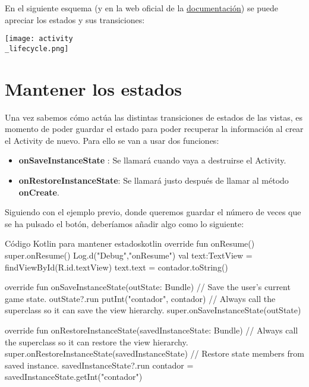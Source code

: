 En el siguiente esquema (y en la web oficial de la \href{https://developer.android.com/guide/components/activities/activity-lifecycle#alc}{documentación}) se puede apreciar los estados y sus transiciones:

\begin{center}
    \texttt{[image: activity\\\_lifecycle.png]}
\end{center}



\section{Mantener los estados}

Una vez sabemos cómo actúa las distintas transiciones de estados de las vistas, es momento de poder guardar el estado para poder recuperar la información al crear el Activity de nuevo. Para ello se van a usar dos funciones:

\begin{itemize}
    \item \textbf{onSaveInstanceState} : Se llamará cuando vaya a destruirse el Activity.
    \item \textbf{onRestoreInstanceState}: Se llamará justo después de llamar al método \textbf{onCreate}.
\end{itemize}

Siguiendo con el ejemplo previo, donde queremos guardar el número de veces que se ha pulsado el botón, deberíamos añadir algo como lo siguiente:

\begin{mycode}{Código Kotlin para mantener estados}{kotlin}{}
override fun onResume(){
    super.onResume()
    Log.d("Debug","onResume")
    val text:TextView = findViewById(R.id.textView)
    text.text = contador.toString()
}

override fun onSaveInstanceState(outState: Bundle) {
    // Save the user's current game state.
    outState?.run {
        putInt("contador", contador)
    }
    // Always call the superclass so it can save the view hierarchy.
    super.onSaveInstanceState(outState)
}

override fun onRestoreInstanceState(savedInstanceState: Bundle) {
    // Always call the superclass so it can restore the view hierarchy.
    super.onRestoreInstanceState(savedInstanceState)
    // Restore state members from saved instance.
    savedInstanceState?.run {
        contador = savedInstanceState.getInt("contador")
    }
}
\end{mycode}